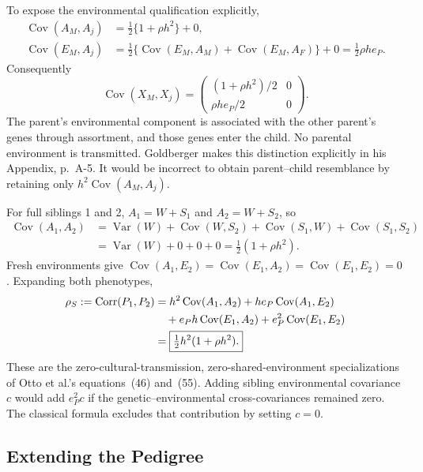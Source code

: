 To expose the environmental qualification explicitly,
\begin{align*}
 \operatorname{Cov}(A_M,A_j)
 &=\tfrac12\{1+\rho h^2\}+0,\\
 \operatorname{Cov}(E_M,A_j)
 &=\tfrac12\{\operatorname{Cov}(E_M,A_M)
             +\operatorname{Cov}(E_M,A_F)\}+0
   =\tfrac12\rho h e_P.
\end{align*}
Consequently
\[
 \operatorname{Cov}(X_M,X_j)=
 \begin{pmatrix}(1+\rho h^2)/2&0\\\rho h e_P/2&0\end{pmatrix}.
\]
The parent's environmental component is associated with the other
parent's genes through assortment, and those genes enter the child.
No parental environment is transmitted. Goldberger makes this
distinction explicitly in his Appendix, p.~A-5. It would be incorrect
to obtain parent--child resemblance by retaining only
$h^2\operatorname{Cov}(A_M,A_j)$.

For full siblings 1 and 2, $A_1=W+S_1$ and $A_2=W+S_2$, so
\begin{align*}
 \operatorname{Cov}(A_1,A_2)
 &=\operatorname{Var}(W)+\operatorname{Cov}(W,S_2)
   +\operatorname{Cov}(S_1,W)+\operatorname{Cov}(S_1,S_2)\\
 &=\operatorname{Var}(W)+0+0+0
   =\tfrac12(1+\rho h^2).
\end{align*}
Fresh environments give
$\operatorname{Cov}(A_1,E_2)=\operatorname{Cov}(E_1,A_2)
=\operatorname{Cov}(E_1,E_2)=0$. Expanding both phenotypes,
\begin{align}
 \rho_S:=\operatorname{Corr}(P_1,P_2)
 &=h^2\operatorname{Cov}(A_1,A_2)
   +h e_P\operatorname{Cov}(A_1,E_2)\notag\\
 &\quad+e_P h\operatorname{Cov}(E_1,A_2)
   +e_P^2\operatorname{Cov}(E_1,E_2)\notag\\
 &=\boxed{\tfrac12h^2(1+\rho h^2).}
 \label{eq:sib}
\end{align}
These are the zero-cultural-transmission, zero-shared-environment
specializations of Otto et al.'s equations~(46) and~(55).
Adding sibling environmental covariance $c$ would add $e_P^2c$ if the
genetic--environmental cross-covariances remained zero. The classical
formula excludes that contribution by setting $c=0$.

\subsection{Extending the Pedigree}
\label{sec:model-extended}

